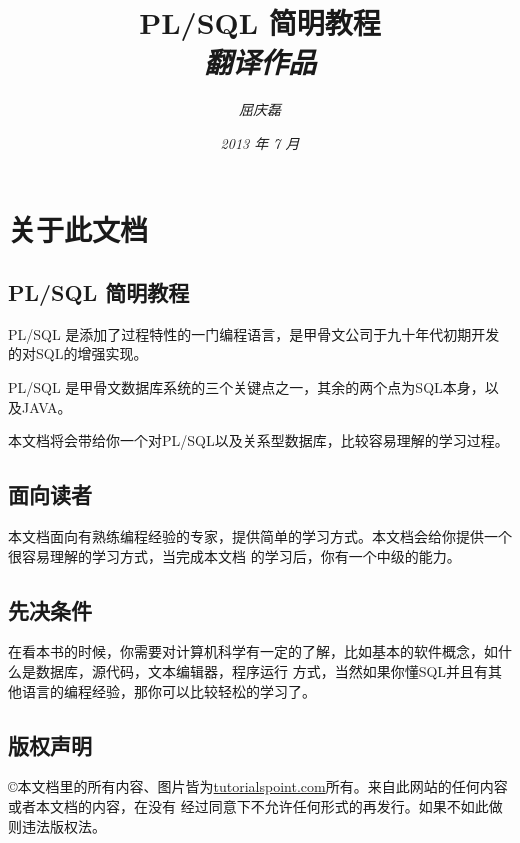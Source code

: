 \documentclass{article}
\begin{document}
\title{
  {\huge \textsf{PL/SQL 简明教程}\\\smallskip}
  {\small \textit{翻译作品}}
}

\author{\textit{屈庆磊}\\[2mm]
       }

\date{\textit{2013 年 7 月}}

\maketitle
\begin{multicols}{2}
\tableofcontents
\end{multicols}

\section{关于此文档}
\subsection{PL/SQL 简明教程}
PL/SQL 是添加了过程特性的一门编程语言，是甲骨文公司于九十年代初期开发的对SQL的增强实现。

PL/SQL 是甲骨文数据库系统的三个关键点之一，其余的两个点为SQL本身，以及JAVA。

本文档将会带给你一个对PL/SQL以及关系型数据库，比较容易理解的学习过程。

\subsection{面向读者}
本文档面向有熟练编程经验的专家，提供简单的学习方式。本文档会给你提供一个很容易理解的学习方式，当完成本文档
的学习后，你有一个中级的能力。

\subsection{先决条件}
在看本书的时候，你需要对计算机科学有一定的了解，比如基本的软件概念，如什么是数据库，源代码，文本编辑器，程序运行
方式，当然如果你懂SQL并且有其他语言的编程经验，那你可以比较轻松的学习了。

\subsection{版权声明}
\copyright 本文档里的所有内容、图片皆为\url{tutorialspoint.com}所有。来自此网站的任何内容或者本文档的内容，在没有
经过同意下不允许任何形式的再发行。如果不如此做则违法版权法。
\end{document}
